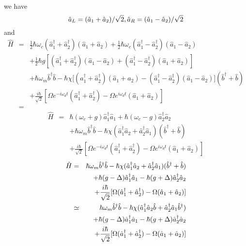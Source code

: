\documentclass{article}
\begin{document}
we have%
\begin{equation*}
\hat{a}_{L}=(\hat{a}_{1}+\hat{a}_{2})/\sqrt{2},\hat{a}_{R}=(\hat{a}_{1}-\hat{%
a}_{2})/\sqrt{2}
\end{equation*}%
and%
\begin{eqnarray*}
\hat{H} &=&\frac{1}{2}\hbar \omega _{c}(\hat{a}_{1}^{\dag }+\hat{a}%
_{2}^{\dag })(\hat{a}_{1}+\hat{a}_{2})+\frac{1}{2}\hbar \omega _{c}(\hat{a}%
_{1}^{\dag }-\hat{a}_{2}^{\dag })(\hat{a}_{1}-\hat{a}_{2}) \\
&&+\frac{1}{2}\hbar g[(\hat{a}_{1}^{\dag }+\hat{a}_{2}^{\dag })(\hat{a}_{1}-%
\hat{a}_{2})+(\hat{a}_{1}^{\dag }-\hat{a}_{2}^{\dag })(\hat{a}_{1}+\hat{a}%
_{2})] \\
&&+\hbar \omega _{m}\hat{b}^{\dag }\hat{b}-\hbar \chi \lbrack (\hat{a}%
_{1}^{\dag }+\hat{a}_{2}^{\dag })(\hat{a}_{1}+\hat{a}_{2})-(\hat{a}%
_{1}^{\dag }-\hat{a}_{2}^{\dag })(\hat{a}_{1}-\hat{a}_{2})](\hat{b}^{\dag }+%
\hat{b}) \\
&&+\frac{i\hbar }{\sqrt{2}}[\Omega e^{-i\omega _{d}t}(\hat{a}_{1}^{\dag }+%
\hat{a}_{2}^{\dag })-\Omega e^{i\omega _{d}t}(\hat{a}_{1}+\hat{a}_{2})] \\
&=&
\end{eqnarray*}%
\begin{eqnarray*}
\hat{H} &=&\hbar (\omega _{c}+g)\hat{a}_{1}^{\dag }\hat{a}_{1}+\hbar (\omega
_{c}-g)\hat{a}_{2}^{\dag }\hat{a}_{2} \\
&&+\hbar \omega _{m}\hat{b}^{\dag }\hat{b}-\hbar \chi (\hat{a}_{1}^{\dag }%
\hat{a}_{2}+\hat{a}_{2}^{\dag }\hat{a}_{1})(\hat{b}^{\dag }+\hat{b}) \\
&&+\frac{i\hbar }{\sqrt{2}}[\Omega e^{-i\omega _{d}t}(\hat{a}_{1}^{\dag }+%
\hat{a}_{2}^{\dag })-\Omega e^{i\omega _{d}t}(\hat{a}_{1}+\hat{a}_{2})]
\end{eqnarray*}%
\begin{eqnarray*}
\hat{H} &=&\hbar \omega _{m}\hat{b}^{\dag }\hat{b}-\hbar \chi (\hat{a}%
_{1}^{\dag }\hat{a}_{2}+\hat{a}_{2}^{\dag }\hat{a}_{1})(\hat{b}^{\dag }+\hat{%
b}) \\
&&+\hbar (g-\Delta )\hat{a}_{1}^{\dag }\hat{a}_{1}-\hbar (g+\Delta )\hat{a}%
_{2}^{\dag }\hat{a}_{2} \\
&&+\frac{i\hbar }{\sqrt{2}}[\Omega (\hat{a}_{1}^{\dag }+\hat{a}_{2}^{\dag
})-\Omega (\hat{a}_{1}+\hat{a}_{2})] \\
&\simeq &\hbar \omega _{m}\hat{b}^{\dag }\hat{b}-\hbar \chi (\hat{a}%
_{1}^{\dag }\hat{a}_{2}\hat{b}+\hat{a}_{2}^{\dag }\hat{a}_{1}\hat{b}^{\dag })
\\
&&+\hbar (g-\Delta )\hat{a}_{1}^{\dag }\hat{a}_{1}-\hbar (g+\Delta )\hat{a}%
_{2}^{\dag }\hat{a}_{2} \\
&&+\frac{i\hbar }{\sqrt{2}}[\Omega (\hat{a}_{1}^{\dag }+\hat{a}_{2}^{\dag
})-\Omega (\hat{a}_{1}+\hat{a}_{2})]
\end{eqnarray*}%
\end{document}
